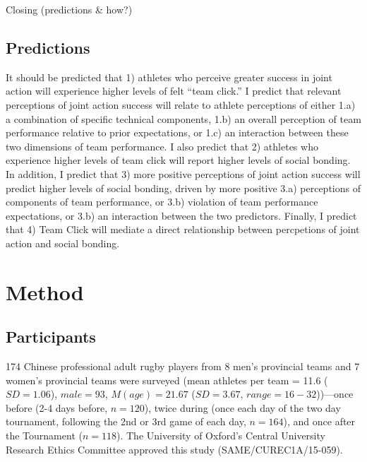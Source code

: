 Closing (predictions & how?)




\subsection{Predictions}
It should be predicted that 1) athletes who perceive greater success in joint action will experience higher levels of felt  ``team click.'' I predict that relevant perceptions of joint action success will relate to athlete perceptions of either 1.a) a combination of specific technical components, 1.b) an overall perception of team performance relative to prior expectations, or 1.c) an interaction between these two dimensions of team performance.
I also predict that 2) athletes who experience higher levels of team click will report higher levels of social bonding. In addition, I predict that 3) more positive perceptions of joint action success will predict higher levels of social bonding, driven by more positive 3.a) perceptions of components of team performance, or 3.b) violation of team performance expectations, or 3.b) an interaction between the two predictors.  Finally, I predict that 4) Team Click will mediate a direct relationship between percpetions of joint action and social bonding.





\section{Method}

\subsection{Participants}
174 Chinese professional adult rugby players from 8 men’s provincial teams and 7 women’s provincial teams were surveyed  (mean athletes per team = 11.6 ($SD =1.06$), $male = 93$, $M(age) = 21.67$ ($SD = 3.67$, $range = 16 - 32$))---once before (2-4 days before, $n = 120$), twice during (once each day of the two day tournament, following the 2nd or 3rd game of each day, $n = 164$), and once after the Tournament ($n = 118$).  The University of Oxford’s Central University Research Ethics Committee approved this study (SAME/CUREC1A/15-059).


